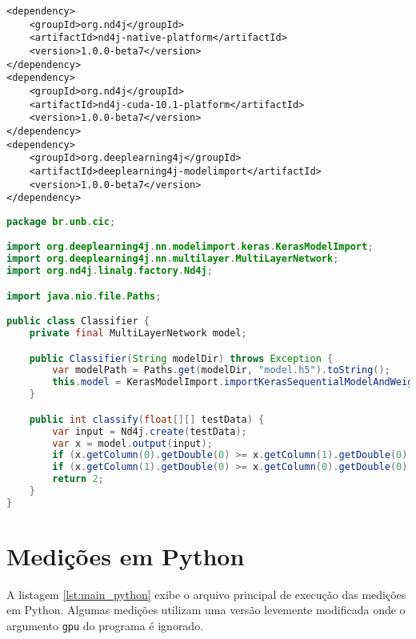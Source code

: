\begin{lstlisting}[caption=Dependências Maven para uso de Deeplearning4j com GPU]
<dependency>
    <groupId>org.nd4j</groupId>
    <artifactId>nd4j-native-platform</artifactId>
    <version>1.0.0-beta7</version>
</dependency>
<dependency>
    <groupId>org.nd4j</groupId>
    <artifactId>nd4j-cuda-10.1-platform</artifactId>
    <version>1.0.0-beta7</version>
</dependency>
<dependency>
    <groupId>org.deeplearning4j</groupId>
    <artifactId>deeplearning4j-modelimport</artifactId>
    <version>1.0.0-beta7</version>
</dependency>
\end{lstlisting}

\begin{lstlisting}[language=Java, caption=Classificador implementado em Java utilizando Deeplearning4j]
package br.unb.cic;

import org.deeplearning4j.nn.modelimport.keras.KerasModelImport;
import org.deeplearning4j.nn.multilayer.MultiLayerNetwork;
import org.nd4j.linalg.factory.Nd4j;

import java.nio.file.Paths;

public class Classifier {
    private final MultiLayerNetwork model;

    public Classifier(String modelDir) throws Exception {
        var modelPath = Paths.get(modelDir, "model.h5").toString();
        this.model = KerasModelImport.importKerasSequentialModelAndWeights(modelPath);
    }

    public int classify(float[][] testData) {
        var input = Nd4j.create(testData);
        var x = model.output(input);
        if (x.getColumn(0).getDouble(0) >= x.getColumn(1).getDouble(0) && x.getColumn(0).getDouble(0) >= x.getColumn(2).getDouble(0)) return 0;
        if (x.getColumn(1).getDouble(0) >= x.getColumn(0).getDouble(0) && x.getColumn(1).getDouble(0) >= x.getColumn(2).getDouble(0)) return 1;
        return 2;
    }
}
\end{lstlisting}

\section{Medições em Python}

A listagem \ref{lst:main_python} exibe o arquivo principal de execução das medições em Python. Algumas medições utilizam uma versão levemente modificada onde o argumento \texttt{gpu} do programa é ignorado.

